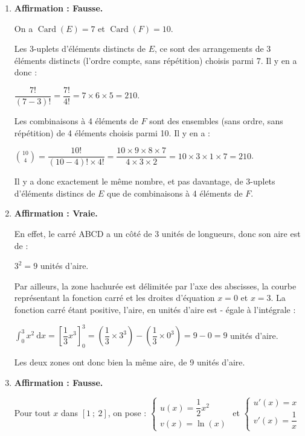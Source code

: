 \begin{enumerate}
	\item \textbf{Affirmation \theenumi : Fausse.}

	On a $\operatorname{Card}(E) = 7$ et $\operatorname{Card}(F) = 10$.

	Les 3-uplets d'éléments distincts de $E$, ce sont des arrangements de 3 éléments distincts (l'ordre compte, sans répétition) choisis parmi 7. Il y en a donc :

	$\dfrac{7 !}{(7 - 3)!} = \dfrac{7!}{4!} = 7 \times 6 \times 5 = 210$.

	Les combinaisons à 4 éléments de $F$ sont des ensembles (sans ordre, sans répétition) de 4 éléments choisis parmi 10. Il y en a :

	$\displaystyle \binom{10}{4} = \dfrac{10!}{(10-4)! \times 4!} = \dfrac{10 \times 9 \times 8 \times 7}{4 \times 3 \times 2} = 10 \times 3 \times 1 \times 7 = 210$.

	Il y a donc exactement le même nombre, et pas davantage, de 3-uplets d'éléments distincs de $E$ que de combinaisons à 4 éléments de $F$.

	\item \textbf{Affirmation \theenumi : Vraie.}

	En effet, le carré ABCD a un côté de 3 unités de longueurs, donc son aire est de :

	$3^2 = 9$ unités d'aire.

	Par ailleurs, la zone hachurée est délimitée par l'axe des abscisses, la courbe représentant la fonction carré et les droites d'équation $x = 0$ et $x=3$. La fonction carré étant positive, l'aire, en unités d'aire est - égale à l'intégrale :

$\displaystyle \int_{0}^{3} x^2 ~\mathrm{d} x = \left[\dfrac{1}{3}x^3\right]_0^3 = \left(\dfrac{1}{3}\times 3^3\right) - \left(\dfrac{1}{3}\times 0^3\right) = 9 - 0 = 9$ unités d'aire.

Les deux zones ont donc bien la même aire, de 9 unités d'aire.

	\item \textbf{Affirmation \theenumi : Fausse.}

Pour tout $x$ dans $[1~;~2]$, on pose :\quad
$\begin{cases}
u(x) = \dfrac{1}{2}x^2\\
v(x) = \ln(x)
\end{cases}$
\quad et \quad
$\begin{cases}
u'(x) = x\\
v'(x) = \dfrac{1}{x}
\end{cases}$


\end{enumerate}
